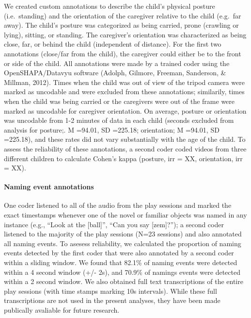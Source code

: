 \documentclass[english,man]{apa6}
\begin{document}
We created custom annotations to describe the child's physical posture
(i.e.~standing) and the orientation of the caregiver relative to the
child (e.g.~far away). The child's posture was categorized as being
carried, prone (crawling or lying), sitting, or standing. The
caregiver's orientation was characterized as being close, far, or behind
the child (independent of distance). For the first two annotations
(close/far from the child), the caregiver could either be to the front
or side of the child. All annotations were made by a trained coder using
the OpenSHAPA/Datavyu software (Adolph, Gilmore, Freeman, Sanderson, \&
Millman, 2012). Times when the child was out of view of the tripod
camera were marked as uncodable and were excluded from these
annotations; similarily, times when the child was being carried or the
caregivers were out of the frame were marked as uncodable for caregiver
orientation. On average, posture or orientation was uncodable from 1-2
minutes of data in each child (seconds excluded from analysis for
posture;. M =94.01, SD =225.18; orientation; M =94.01, SD =225.18), and
these rates did not vary substantially with the age of the child. To
assess the reliability of these annotations, a second coder coded videos
from three different children to calculate Cohen's kappa (posture, irr =
XX, orientation, irr = XX).

\paragraph{Naming event annotations}\label{naming-event-annotations}

One coder listened to all of the audio from the play sessions and marked
the exact timestamps whenever one of the novel or familiar objects was
named in any instance (e.g., \enquote{Look at the {[}ball{]}},
\enquote{Can you say {[}zem{]}?}); a second coder listened to the
majority of the play sessions (N=23 sessions) and also annotated all
naming events. To asesess reliability, we calculated the proportion of
naming events detected by the first coder that were also annotated by a
second coder within a sliding window. We found that 82.1\% of naming
events were detected within a 4 second window (+/- 2s), and 70.9\% of
namings events were detected within a 2 second window. We also obtained
full text transcriptions of the entire play sessions (with time stamps
marking 10s intervals). While these full transcriptions are not used in
the present analyses, they have been made publically avaliable for
future research.
\end{document}
